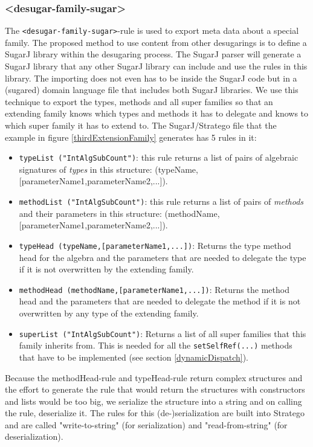 \documentclass{report}
\begin{document}
\subsubsection{\textless{}desugar-family-sugar\textgreater}
The \lstinline{<desugar-family-sugar>}-rule is used to export meta data about a special family. The proposed method to use content from other desugarings is to define a SugarJ library within the desugaring process. The SugarJ parser will generate a SugarJ library that any other SugarJ library can include and use the rules in this library. The importing does not even has to be inside the SugarJ code but in a (sugared) domain language file that includes both SugarJ libraries. We use this technique to export the types, methods and all super families so that an extending family knows which types and methods it has to delegate and knows to which super family it has to extend to. The SugarJ/Stratego file that the example in figure \ref{thirdExtensionFamily} generates has 5 rules in it:
\begin{itemize}
    \item \lstinline{typeList ("IntAlgSubCount")}: this rule returns a list of pairs of algebraic signatures of \emph{types} in this structure: (typeName,[parameterName1,parameterName2,...]).
    \item \lstinline{methodList ("IntAlgSubCount")}: this rule returns a list of pairs of \emph{methods} and their parameters in this structure: (methodName,[parameterName1,parameterName2,...]).
    \item \lstinline{typeHead (typeName,[parameterName1,...])}: Returns the type method head for the algebra and the parameters that are needed to delegate the type if it is not overwritten by the extending family.
    \item \lstinline{methodHead (methodName,[parameterName1,...])}: Returns the method head and the parameters that are needed to delegate the method if it is not overwritten by any type of the extending family.
    \item \lstinline{superList ("IntAlgSubCount")}: Returns a list of all super families that this family inherits from. This is needed for all the \lstinline{setSelfRef(...)} methods that have to be implemented (see section \ref{dynamicDispatch}).
\end{itemize}
Because the methodHead-rule and typeHead-rule return complex structures and the effort to generate the rule that would return the structures with constructors and lists would be too big, we serialize the structure into a string and on calling the rule, deserialize it. The rules for this (de-)serialization are built into Stratego and are called "write-to-string" (for serialization) and "read-from-string" (for deserialization).
\end{document}
